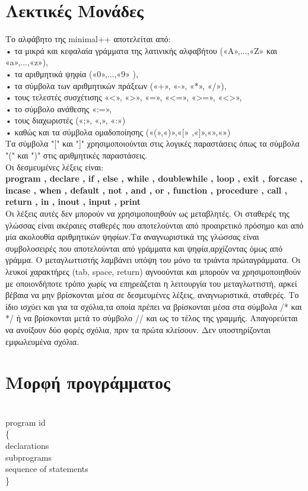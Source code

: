 \documentclass[12pt,a4paper,a4paper]{report}
\begin{document}
\section{Λεκτικές Μονάδες}
Το αλφάβητο της minimal++ αποτελείται από:\\
• τα μικρά και κεφαλαία γράμματα της λατινικής αλφαβήτου («Α»,...,«Ζ» και «a»,...,«z»),\\
• τα αριθμητικά ψηφία («0»,...,«9»    ), \\
• τα σύμβολα των αριθμητικών πράξεων («+», «-», «*», «/»), \\
• τους τελεστές συσχέτισης «<», «>», «=», «<=», «>=», «<>», \\
• το σύμβολο ανάθεσης «:=», \\
• τους διαχωριστές («;», «,», «:») \\
• καθώς και τα σύμβολα ομαδοποίησης («(»,«)»,«[»    ,«]»,«{»,«}»)\\

Τα σύμβολα "[" και "]" χρησιμοποιούνται στις λογικές παραστάσεις όπως τα σύμβολα "(" και ")" στις αριθμητικές παραστάσεις.\\

Οι δεσμευμένες λέξεις είναι:\\

\textbf{program , declare , if , else , while , doublewhile , loop , exit , forcase , incase , when , default , not , and , or , function , procedure , call , return , in , inout , input , print }\\

Οι λέξεις αυτές δεν μπορούν να χρησιμοποιηθούν ως μεταβλητές. Οι σταθερές της γλώσσας είναι ακέραιες σταθερές που αποτελούνται από προαιρετικό πρόσημο και από μία ακολουθία αριθμητικών ψηφίων.Τα αναγνωριστικά της γλώσσας είναι συμβολοσειρές που αποτελούνται από γράμματα και ψηφία,αρχίζοντας όμως από γράμμα. Ο μεταγλωττιστής λαμβάνει υπόψη του μόνο τα τριάντα πρώταγράμματα. Οι λευκοί χαρακτήρες (tab, space, return) αγνοούνται και μπορούν να χρησιμοποιηθούν με οποιονδήποτε τρόπο χωρίς να επηρεάζεται η λειτουργία του μεταγλωττιστή, αρκεί βέβαια να μην βρίσκονται μέσα σε δεσμευμένες λέξεις, αναγνωριστικά, σταθερές. Το ίδιο ισχύει και για τα σχόλια,τα οποία πρέπει να βρίσκονται μέσα στα σύμβολα /* και */ ή να βρίσκονται μετά το σύμβολο // και ως το τέλος της γραμμής. Απαγορεύεται να ανοίξουν δύο φορές σχόλια, πριν τα πρώτα κλείσουν. Δεν υποστηρίζονται εμφωλευμένα σχόλια.

\section{Μορφή προγράμματος}
\hspace{10mm}\\
program id\\
\{\\
\hspace*{10mm}declarations\\
\hspace*{10mm}subprograms\\
\hspace*{10mm}sequence of statements\\
\}\\
\end{document}
